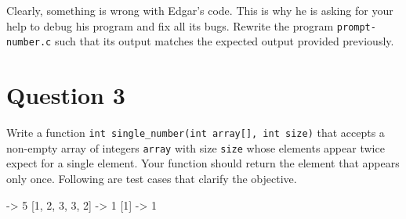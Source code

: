\documentclass[12pt,letterpaper,twoside]{article}
\begin{document}
\newpage

Clearly, something is wrong with Edgar's code.
This is why he is asking for your help to debug his program and fix all its bugs.
Rewrite the program \texttt{prompt-number.c} such that its output matches the expected output provided previously.

\section*{Question 3}

Write a function \texttt{int single\_number(int array[], int size)} that accepts a non-empty array of integers \texttt{array} with size \texttt{size} whose elements appear twice expect for a single element.
Your function should return the element that appears only once.
Following are test cases that clarify the objective.

\begin{terminal}
[1, -1, 4, 5, 4, 1, -1] -> 5
[1, 2, 3, 3, 2] -> 1
[1] -> 1
\end{terminal}
\end{document}
